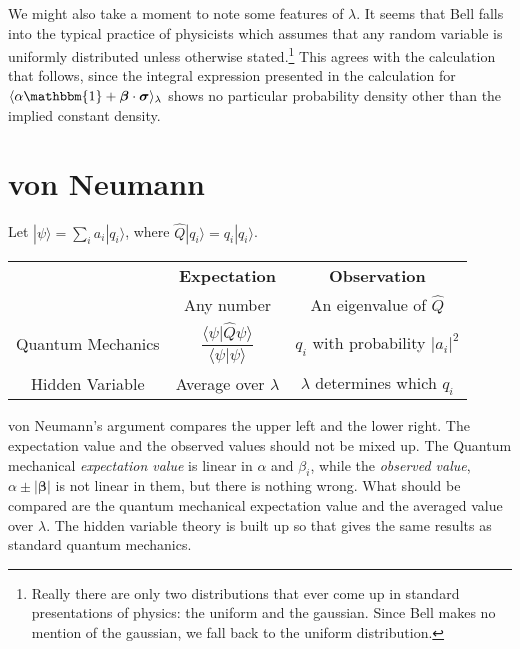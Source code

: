 \documentclass[12pt]{article}
\begin{document}
We might also take a moment to note some features of $\lambda$. It seems that Bell falls into the typical practice of physicists which assumes that any random variable is uniformly distributed unless otherwise stated.\footnote{Really there are only two distributions that ever come up in standard presentations of physics: the uniform and the gaussian. Since Bell makes no mention of the gaussian, we fall back to the uniform distribution.} This agrees with the calculation that follows, since the integral expression presented in the calculation for $\langle \alpha \mathbbm{1} + \bm{\beta} \cdot \bm{\sigma} \rangle_{\lambda}$ shows no particular probability density other than the implied constant density.

\section{von Neumann}
Let $|\psi\rangle=\sum_{i}a_i|q_i\rangle$, where $\hat{Q}|q_i\rangle = q_i |q_i\rangle$.
\begin{center}
  \begin{tabular}{ccc}
    \toprule
    & \textbf{Expectation} & \textbf{Observation} \\
    & Any number & An eigenvalue of $\hat{Q}$ \\
    \midrule
    Quantum Mechanics & $\dfrac{\langle \psi | \hat{Q}\psi \rangle}{\langle \psi | \psi \rangle}$ & $q_i$ with probability $|a_i|^2$\\
    Hidden Variable & Average over $\lambda$ & $\lambda$ determines which $q_i$ \\
    \bottomrule
  \end{tabular}
\end{center}
von Neumann's argument compares the upper left and the lower
right. The expectation value and the observed values should not be
mixed up. The Quantum mechanical {\it expectation value} is linear in
$\alpha$ and $\beta_i$, while the {\it observed value},
$\alpha\pm|\bm{\beta}|$ is not linear in them, but there is nothing
wrong. What should be compared are the quantum mechanical expectation
value and the averaged value over $\lambda$. The hidden variable
theory is built up so that gives the same results as standard quantum mechanics.






\end{document}
